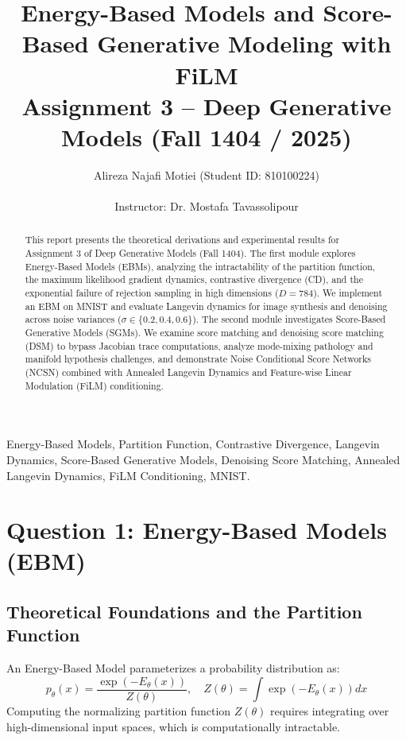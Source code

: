 \documentclass[10pt,journal,compsoc]{IEEEtran}
\begin{document}
\title{Energy-Based Models and Score-Based Generative Modeling with FiLM\\
\large Assignment 3 -- Deep Generative Models (Fall 1404 / 2025)}

\author{Alireza Najafi Motiei (Student ID: 810100224)\\
\\
Instructor: Dr. Mostafa Tavassolipour}


\maketitle

\begin{abstract}
This report presents the theoretical derivations and experimental results for Assignment 3 of Deep Generative Models (Fall 1404). The first module explores Energy-Based Models (EBMs), analyzing the intractability of the partition function, the maximum likelihood gradient dynamics, contrastive divergence (CD), and the exponential failure of rejection sampling in high dimensions ($D=784$). We implement an EBM on MNIST and evaluate Langevin dynamics for image synthesis and denoising across noise variances ($\sigma \in \{0.2, 0.4, 0.6\}$). The second module investigates Score-Based Generative Models (SGMs). We examine score matching and denoising score matching (DSM) to bypass Jacobian trace computations, analyze mode-mixing pathology and manifold hypothesis challenges, and demonstrate Noise Conditional Score Networks (NCSN) combined with Annealed Langevin Dynamics and Feature-wise Linear Modulation (FiLM) conditioning.
\end{abstract}

\begin{IEEEkeywords}
Energy-Based Models, Partition Function, Contrastive Divergence, Langevin Dynamics, Score-Based Generative Models, Denoising Score Matching, Annealed Langevin Dynamics, FiLM Conditioning, MNIST.
\end{IEEEkeywords}

\section{Question 1: Energy-Based Models (EBM)}

\subsection{Theoretical Foundations and the Partition Function}
An Energy-Based Model parameterizes a probability distribution as:
\begin{equation}
p_\theta(x) = \frac{\exp(-E_\theta(x))}{Z(\theta)}, \quad Z(\theta) = \int \exp(-E_\theta(x)) dx
\end{equation}
Computing the normalizing partition function $Z(\theta)$ requires integrating over high-dimensional input spaces, which is computationally intractable.
\end{document}
